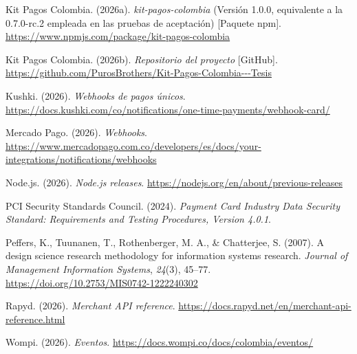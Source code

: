\noindent Kit Pagos Colombia. (2026a). \textit{kit-pagos-colombia} (Versión 1.0.0, equivalente a la 0.7.0-rc.2 empleada en las pruebas de aceptación) [Paquete npm]. \url{https://www.npmjs.com/package/kit-pagos-colombia}

\noindent Kit Pagos Colombia. (2026b). \textit{Repositorio del proyecto} [GitHub]. \url{https://github.com/PurosBrothers/Kit-Pagos-Colombia---Tesis}

\noindent Kushki. (2026). \textit{Webhooks de pagos únicos}. \url{https://docs.kushki.com/co/notifications/one-time-payments/webhook-card/}

\noindent Mercado Pago. (2026). \textit{Webhooks}. \url{https://www.mercadopago.com.co/developers/es/docs/your-integrations/notifications/webhooks}

\noindent Node.js. (2026). \textit{Node.js releases}. \url{https://nodejs.org/en/about/previous-releases}

\noindent PCI Security Standards Council. (2024). \textit{Payment Card Industry Data Security Standard: Requirements and Testing Procedures, Version 4.0.1}.

\noindent Peffers, K., Tuunanen, T., Rothenberger, M. A., \& Chatterjee, S. (2007). A design science research methodology for information systems research. \textit{Journal of Management Information Systems}, \textit{24}(3), 45--77. \url{https://doi.org/10.2753/MIS0742-1222240302}

\noindent Rapyd. (2026). \textit{Merchant API reference}. \url{https://docs.rapyd.net/en/merchant-api-reference.html}

\noindent Wompi. (2026). \textit{Eventos}. \url{https://docs.wompi.co/docs/colombia/eventos/}

\endgroup

